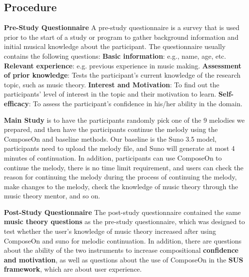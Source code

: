 \subsection{Procedure}
\textbf{Pre-Study Questionnaire}
A pre-study questionnaire is a survey that is used prior to the start of a study or program to gather background information and initial musical knowledge about the participant. The questionnaire usually contains the following questions: \textbf{Basic information}: e.g., name, age, etc. \textbf{Relevant experience}: e.g. previous experience in music making. \textbf{Assessment of prior knowledge}: Tests the participant's current knowledge of the research topic, such as music theory. \textbf{Interest and Motivation}: To find out the participants' level of interest in the topic and their motivation to learn. \textbf{Self-efficacy}: To assess the participant's confidence in his/her ability in the domain.

\textbf{Main Study}
is to have the participants randomly pick one of the 9 melodies we prepared, and then have the participants continue the melody using the ComposeOn and baseline methods. Our baseline is the Suno 3.5 model, participants need to upload the melody file, and Suno will generate at most 4 minutes of continuation. In addition, participants can use ComposeOn to continue the melody, there is no time limit requirement, and users can check the reason for continuing the melody during the process of continuing the melody, make changes to the melody, check the knowledge of music theory through the music theory mentor, and so on.

\textbf{Post-Study Questionnaire}
The post-study questionnaire contained the same \textbf{music theory questions} as the pre-study questionnaire, which was designed to test whether the user's knowledge of music theory increased after using ComposeOn and suno for melodic continuation. In addition, there are questions about the ability of the two instruments to increase compositional \textbf{confidence and motivation}, as well as questions about the use of ComposeOn in the \textbf{SUS framework}, which are about user experience.


